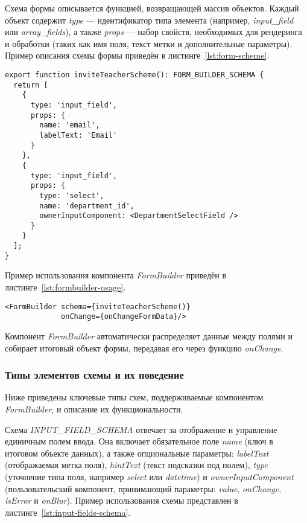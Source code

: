 Схема формы описывается функцией, возвращающей массив объектов. Каждый объект содержит \textit{type} — идентификатор типа элемента (например, \textit{input\_field} или \textit{array\_fields}), а также \textit{props} — набор свойств, необходимых для рендеринга и обработки (таких как имя поля, текст метки и дополнительные параметры). Пример описания схемы формы приведён в листинге~\ref{lst:form-scheme}.

\begin{lstlisting}[caption=Пример описания схемы формы,label=lst:form-scheme]
export function inviteTeacherScheme(): FORM_BUILDER_SCHEMA {
  return [
    {
      type: 'input_field',
      props: {
        name: 'email',
        labelText: 'Email'
      }
    },
    {
      type: 'input_field',
      props: {
        type: 'select',
        name: 'department_id',
        ownerInputComponent: <DepartmentSelectField />
      }
    }
  ];
}
\end{lstlisting}

Пример использования компонента \textit{FormBuilder} приведён в листинге~\ref{lst:formbuilder-usage}.

\begin{lstlisting}[caption=Использование \textit{FormBuilder},label=lst:formbuilder-usage]
<FormBuilder schema={inviteTeacherScheme()} 
			 onChange={onChangeFormData}/>
\end{lstlisting}

Компонент \textit{FormBuilder} автоматически распределяет данные между полями и собирает итоговый объект формы, передавая его через функцию \textit{onChange}.

\subsubsection{Типы элементов схемы и их поведение}
Ниже приведены ключевые типы схем, поддерживаемые компонентом \textit{FormBuilder}, и описание их функциональности.

Схема \textit{INPUT\_FIELD\_SCHEMA} отвечает за отображение и управление единичным полем ввода. Она включает обязательное поле \textit{name} (ключ в итоговом объекте данных), а также опциональные параметры: \textit{labelText} (отображаемая метка поля), \textit{hintText} (текст подсказки под полем), \textit{type} (уточнение типа поля, например \textit{select} или \textit{datetime}) и \textit{ownerInputComponent} (пользовательский компонент, принимающий параметры: \textit{value}, \textit{onChange}, \textit{isError} и \textit{onBlur}). Пример использования схемы представлен в листинге~\ref{lst:input-fields-schema}.

